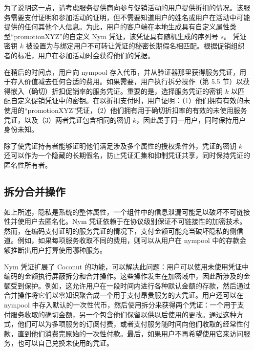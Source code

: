\documentclass{article}
\begin{document}
	为了说明这一点，请考虑服务提供商向参与促销活动的用户提供折扣的情况。该服务需要支付证明和参加活动的证明，但不需要知道用户的姓名或用户在活动中可能提供的任何其他个人信息。为此，用户的客户端在本地生成具有自定义属性类型“promotionXYZ”的自定义 Nym 凭证，该凭证具有随机生成的序列号 $s$。 凭证密钥 $k$ 被设置为与绑定用户不可转让凭证的秘密长期假名相匹配。根据促销组织者的标准，用户在参加活动时会获得他们的凭据。\newline

	在稍后的时间点，用户向 nympool 存入代币，并从验证器那里获得服务凭证，用于存入价值减去任何合适的费用。如果需要，用户执行拆分操作（第 5.5 节）以获得嵌入（确切）折扣促销率的服务凭证。重要的是，选择服务凭证的密钥 $k$ 以匹配自定义促销凭证中的密钥。在以折扣支付时，用户证明：（1）他们拥有有效的未使用的“promotionXYZ”凭证，（2）他们拥有用于确切折扣率的有效的未使用服务凭证，以及（3）两者凭证包含相同的密钥 $k$，因此属于同一用户，同时保持用户身份未知。\newline

	除了使凭证持有者能够证明他们满足涉及多个属性的授权条件外，凭证的密钥 $k$ 还可以作为一个隐藏的长期假名，防止凭证汇集和抑制凭证共享，同时保持凭证的匿名性所有者。\newline

	\subsection{拆分合并操作}

	如上所述，隐私是系统的整体属性，一个组件中的信息泄漏可能足以破坏不可链接性并使用户去匿名化。Nym 凭证依赖于在协议级别保证不可链接性的加密技术。然而，在编码支付证明的服务凭证的情况下，支付金额可能充当破坏隐私的侧信道。例如，如果每项服务收取不同的费用，则可以从用户在 nympool 中的存款金额推断出用户打算使用哪种服务。\newline

	Nym 凭证扩展了 Coconut 的功能，可以解决此问题：用户可以使用未使用凭证中编码的金额执行屏蔽拆分和合并操作。这些操作发生在加密域中，因此所涉及的金额受到保护。例如，这允许用户在一段时间内进行各种默认金额的存款，然后通过合并操作将它们以零知识聚合成一个用于支付昂贵服务的大凭证。用户还可以在 nympool 中存入默认的一次性代币，然后使用拆分来获得两个凭证：一个用于支付服务收取的确切金额，另一个包含他们保留以供以后使用的更改。通过这种方式，他们可以为多项服务的订阅付费，或者支付服务随时间向他们收取的经常性付款，直到他们消费完原始的一次性付款。最后，如果用户不再希望使用它来访问服务，也可以自己兑换未使用的凭证。\newline
\end{document}
